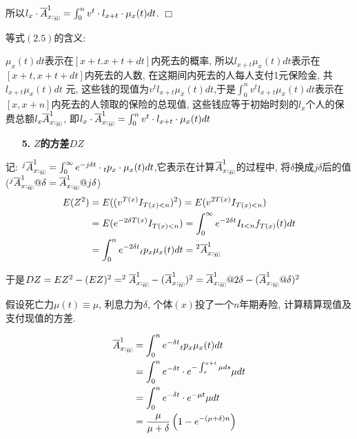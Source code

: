 \documentclass[a4paper,10pt]{ctexbook}
\makeatletter
\newcommand{\hei}{\CJKfamily{hei}}      %
\def\qed{\hfill$\Box$\medskip}
\DeclareRobustCommand{\annu}[1]{_{%
    \def\arraystretch{0}%
    \setlength\arraycolsep{1pt}%
    \setlength\arrayrulewidth{.2pt}%
    \begin{array}[b]{@{}c|}\hline
        \\[\arraycolsep]%
        \scriptstyle #1%
    \end{array}%
}}
\makeatother
\begin{document}
所以$l_x\cdot\overline{A}_{x:\annu{n}}^1=\int_0^{n}{v^{t}\cdot l_{x+t}\cdot \mu_{x}(t)dt}$.
\qed
\begin{remark}等式$(2.5)$的含义:

    $\mu_x(t)dt$表示在$[x+t.x+t+dt]$内死去的概率, 所以$l_{x+t}\mu_x(t)dt$表示在$[x+t,x+t+dt]$内死去的人数, 在这期间内死去的人每人支付1元保险金, 共$l_{x+t}\mu_x(t)dt$ 元, 这些钱的现值为$v^t l_{x+t}\mu_x(t)dt$,于是$\int_0^n{v^t l_{x+t}\mu_x(t)dt}$表示在$[x,x+n]$内死去的人领取的保险的总现值, 这些钱应等于初始时刻的$l_x$个人的保费总额$l_x\overline{A}_{x:\annu{n}}^1$, 即$l_x\cdot\overline{A}_{x:\annu{n}}^1=\int_0^{n}{v^{t}\cdot l_{x+t}\cdot \mu_{x}(t)dt}$

\end{remark}

\begin{itemize}
    \item[{\bf\hei 5.}]{\bf\hei $Z$的方差$DZ$}
\end{itemize}

记: $^j\overline{A}_{x:\annu{n}}^1=\int_0^{\infty}{e^{-j\delta t}\cdot {}_tp_x\cdot \mu_{x}(t)dt}$,它表示在计算$\overline{A}_{x:\annu{n}}^1$的过程中, 将$\delta$换成$j\delta$后的值($^j\overline{A}_{x:\annu{n}}^1@\delta=\overline{A}_{x:\annu{n}}^1@j\delta$)
\begin{align*}
    E(Z^2) & =E((v^{T(x)}I_{T(x)<n})^2)=E(v^{2T(x)}I_{T(x)<n})                                   \\
           & =E(e^{-2\delta T(x)}I_{T(x)<n})=\int_0^{\infty}{e^{-2\delta t}I_{t<n}f_{T(x)}(t)dt} \\
           & =\int_0^n{e^{-2\delta t}{}_tp_x\mu_x(t)dt}={}^2\overline{A}_{x:\annu{n}}^1
\end{align*}

于是$DZ=EZ^2-(EZ)^2=^2\overline{A}_{x:\annu{n}}^1-(\overline{A}_{x:\annu{n}}^1)^2=\overline{A}_{x:\annu{n}}^1@2\delta-(\overline{A}_{x:\annu{n}}^1@\delta)^2$

\begin{example}
    假设死亡力$\mu(t) \equiv \mu $, 利息力为$\delta$, 个体$(x)$投了一个$n$年期寿险, 计算精算现值及支付现值的方差.
\end{example}

\solution
\begin{align*}
    \overline{A}_{x:\annu{n}}^1 & = \int_0^n{e^{-\delta t}{}_tp_x\mu_x(t)dt}                        \\
                                & = \int_0^n{e^{-\delta t}\cdot e^{-\int_{x}^{x+t} \mu ds}\mu dt}   \\
                                & = \int_0^n{e^{-\delta t}\cdot e^{-\mu t}\mu dt}                   \\
                                & = \frac{\mu}{\mu + \delta} \left(1 - e^{-(\mu + \delta)n} \right)
\end{align*}
\end{document}
